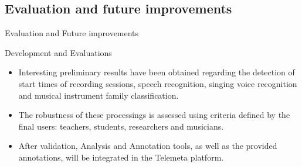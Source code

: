 \documentclass[final, hyperref, table]{beamer}
\begin{document}
\subsection{Evaluation and future improvements}
\begin{frame}{Evaluation and Future improvements}
  \begin{block}{Development and Evaluations}
    \begin{itemize}
    \item Interesting
      preliminary results have been obtained regarding the detection
      of start times of recording sessions, speech recognition,
      singing voice recognition and musical instrument family
      classification.

    \item The robustness of these processings is assessed using \alert{criteria
      defined by the final users}: teachers, students, researchers and
      musicians.
    \item \alert{After validation}, Analysis and Annotation tools, as well as the provided annotations, will be integrated in the Telemeta platform.
    \end{itemize}
  \end{block}
  \end{frame}
\end{document}
